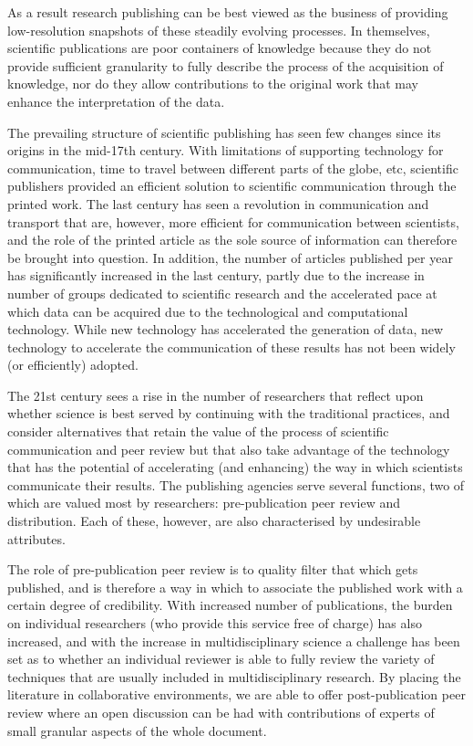 \documentclass[final,authoryear,3p]{elsarticle-open-drafting}
\begin{document}
As a result research publishing can be best viewed as the business of providing low-resolution snapshots of these
steadily evolving processes. In themselves, scientific publications are poor containers of knowledge because they do not provide sufficient granularity to fully describe the process of the acquisition of knowledge, nor do they allow contributions to the original work that may enhance the interpretation of the data. 

The prevailing structure of scientific publishing has seen few changes since its origins in the mid-17th century. With limitations of supporting technology for communication, time to travel between different parts of the globe, etc, scientific publishers provided an efficient solution to scientific communication through the printed work. The last century has seen a revolution in communication and transport that are, however, more efficient for communication between scientists, and the role of the printed article as the sole source of information can therefore be brought into question. In addition, the number of articles published per year has significantly increased in the last century, partly due to the increase in number of groups dedicated to scientific research and the accelerated pace at which data can be acquired due to the technological and computational technology. While new technology has accelerated the generation of data, new technology to accelerate the communication of these results has not been widely (or efficiently) adopted. 

The 21st century sees a rise in the number of researchers that reflect upon whether science is best served by continuing with the traditional practices, and consider alternatives that retain the value of the process of scientific communication and peer review but that also take advantage of the technology that has the potential of accelerating (and enhancing) the way in which scientists communicate their results. The publishing agencies serve several functions, two of which are valued most by researchers: pre-publication peer review and distribution. Each of these, however, are also characterised by undesirable attributes.

The role of pre-publication peer review is to quality filter that which gets published, and is therefore a way in which to associate the published work with a certain degree of credibility. With increased number of publications, the burden on individual researchers (who provide this service free of charge) has also increased, and with the increase in multidisciplinary science a challenge has been set as to whether an individual reviewer is able to fully review the variety of techniques that are usually included in multidisciplinary research. By placing the literature in collaborative environments, we are able to offer post-publication peer review where an open discussion can be had with contributions of experts of small granular aspects of the whole document. 
\end{document}
